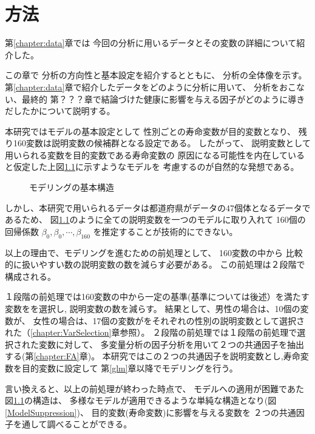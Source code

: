 


\chapter{方法}\label{chapter:methods}


第\ref{chapter:data}章では
今回の分析に用いるデータとその変数の詳細について紹介した。

この章で
分析の方向性と基本設定を紹介するとともに、
分析の全体像を示す。
第\ref{chapter:data}章で紹介したデータをどのように分析に用いて、
分析をおこない、最終的
第？？？章で結論づけた健康に影響を与える因子がどのように導きだしたかについて説明する。

本研究ではモデルの基本設定として
性別ごとの寿命変数が目的変数となり、
残り160変数は説明変数の候補群となる設定である。
したがって、
説明変数として用いられる変数を目的変数である寿命変数の
原因になる可能性を内在していると仮定した上図\ref{ModelStructure}に示すようなモデルを
考慮するのが自然的な発想である。


\begin{figure}[H]
	\caption{モデリングの基本構造}
	\label{ModelStructure}
\end{figure}



しかし、本研究で用いられるデータは都道府県がデータの47個体となるデータであるため、
図\ref{ModelStructure}のように全ての説明変数を一つのモデルに取り入れて
160個の回帰係数
$\beta_0 ,\beta_0 ,\cdots , \beta_{160}$
を推定することが技術的にできない。

以上の理由で、モデリングを進むための前処理として、
160変数の中から
比較的に扱いやすい数の説明変数の数を減らす必要がある。
この前処理は２段階で構成される。

１段階の前処理では160変数の中から一定の基準(基準については後述）を満たす変数をを選択し, 説明変数の数を減らす。
結果として、男性の場合は、10個の変数が、
女性の場合は、17個の変数がをそれぞれの性別の説明変数として選択された（\ref{chapter:VarSelection}章参照）。
２段階の前処理では１段階の前処理で選択された変数に対して、
多変量分析の因子分析を用いて２つの共通因子を抽出する(第\ref{chapter:FA}章)。
本研究ではこの２つの共通因子を説明変数とし,寿命変数を目的変数に設定して
第\ref{glm}章以降でモデリングを行う。

言い換えると、以上の前処理が終わった時点で、
モデルへの適用が困難であた
図\ref{ModelStructure}の構造は、
多様なモデルが適用できるような単純な構造となり(図\ref{ModelSuppression})、
目的変数(寿命変数)に影響を与える変数を
２つの共通因子を通して調べることができる。

